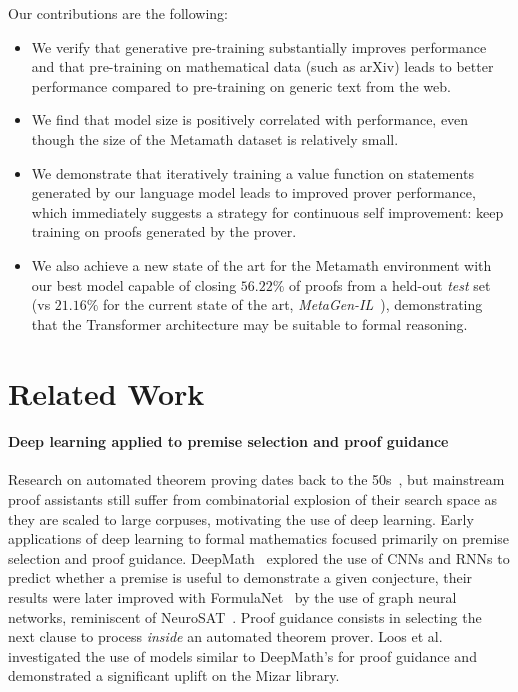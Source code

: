 \documentclass{article}
\begin{document}
Our contributions are the following:
\begin{itemize}

\item We verify that generative pre-training substantially improves performance and that pre-training on mathematical data (such as arXiv) leads to better performance compared to pre-training on generic text from the web. \item We find that model size is positively correlated with performance, even though the size  of the Metamath dataset is relatively small. \item We demonstrate that iteratively training a value function on statements generated by our language model leads to improved prover performance, which immediately suggests a strategy for continuous self improvement: keep training on proofs generated by the prover.
\item We also achieve a new state of the art for the Metamath environment with our best model capable of closing $56.22\%$ of proofs from a held-out \textit{test} set (vs $21.16\%$ for the current state of the art, \textit{MetaGen-IL}~\cite{wang2020learning}), demonstrating that the Transformer architecture may be suitable to formal reasoning.
\end{itemize}

\section{Related Work}

\paragraph{Deep learning applied to premise selection and proof guidance} Research on automated theorem proving dates back to the 50s~\cite{harrison2014history}, but mainstream proof assistants still suffer from combinatorial explosion of their search space as they are scaled to large corpuses, motivating the use of deep learning. Early applications of deep learning to formal mathematics focused primarily on premise selection and proof guidance. DeepMath~\cite{irving2016deepmath} explored the use of CNNs and RNNs to predict whether a premise is useful to demonstrate a given conjecture, their results were later improved with FormulaNet~\cite{wang2017premise} by the use of graph neural networks, reminiscent of NeuroSAT~\cite{selsam2018learning}. Proof guidance consists in selecting the next clause to process \textit{inside} an automated theorem prover. Loos et al.~\cite{loos2017deep} investigated the use of models similar to DeepMath's for proof guidance and demonstrated a significant uplift on the Mizar library.
\end{document}
